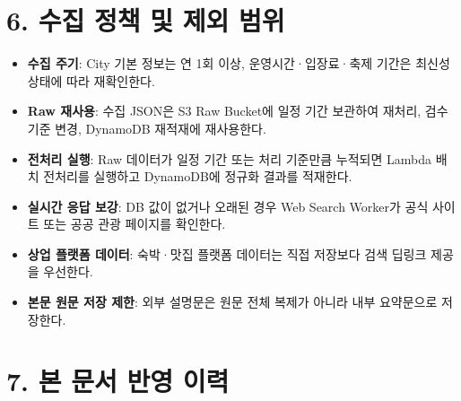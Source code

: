\documentclass[12pt,a4paper]{article}
\newcommand{\DocNeedspace}[1]{\par\ifdim\dimexpr\pagegoal-\pagetotal\relax<#1\newpage\fi}
\newcommand{\TocNoChildTight}{\vspace{-0.28em}}
\begin{document}
\newpage

\DocNeedspace{10\baselineskip}
\section*{6. 수집 정책 및 제외 범위}
\addtocontents{toc}{\protect\TocNoChildTight}


\begin{itemize}
\item \textbf{수집 주기}: City 기본 정보는 연 1회 이상, 운영시간·입장료·축제 기간은 최신성 상태에 따라 재확인한다.
\item \textbf{Raw 재사용}: 수집 JSON은 S3 Raw Bucket에 일정 기간 보관하여 재처리, 검수 기준 변경, DynamoDB 재적재에 재사용한다.
\item \textbf{전처리 실행}: Raw 데이터가 일정 기간 또는 처리 기준만큼 누적되면 Lambda 배치 전처리를 실행하고 DynamoDB에 정규화 결과를 적재한다.
\item \textbf{실시간 응답 보강}: DB 값이 없거나 오래된 경우 Web Search Worker가 공식 사이트 또는 공공 관광 페이지를 확인한다.
\item \textbf{상업 플랫폼 데이터}: 숙박·맛집 플랫폼 데이터는 직접 저장보다 검색 딥링크 제공을 우선한다.
\item \textbf{본문 원문 저장 제한}: 외부 설명문은 원문 전체 복제가 아니라 내부 요약문으로 저장한다.
\end{itemize}


\newpage

\DocNeedspace{10\baselineskip}
\section*{7. 본 문서 반영 이력}
\addtocontents{toc}{\protect\TocNoChildTight}
\end{document}
